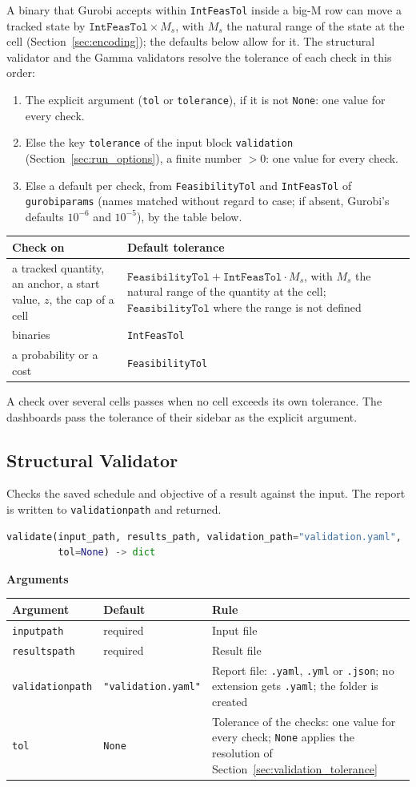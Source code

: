 \documentclass[11pt,a4paper]{article}
\makeatletter
\theoremstyle{plain}
\theoremstyle{definition}
\newcommand{\blockhead}[1]{\par\noindent\textbf{#1}\par\nobreak}
\renewcommand{\_}{\textunderscore\allowbreak{}}
\providecommand{\rejrow}[2]{{\raggedright #1\par} & {\raggedright #2\par} \\}
\providecommand{\typerow}[3]{{\raggedright #1\par} & {\raggedright #2\par} & {\raggedright #3\par} \\}
\providecommand{\tabstart}[2]{\begingroup\small\begin{longtable}{@{}#1@{}}\toprule #2 \\ \midrule \endhead}
\providecommand{\tabend}{\bottomrule\end{longtable}\endgroup}
\makeatother
\begin{document}
A binary that Gurobi accepts within \texttt{IntFeasTol} inside a big-M row can move a tracked state by $\texttt{IntFeasTol} \times M_s$, with $M_s$ the natural range of the state at the cell (Section~\ref{sec:encoding}); the defaults below allow for it.
The structural validator and the Gamma validators resolve the tolerance of each check in this order:
\begin{enumerate}[nosep,label=\arabic*.]
  \item The explicit argument (\texttt{tol} or \texttt{tolerance}), if it is not \texttt{None}: one value for every check.
  \item Else the key \texttt{tolerance} of the input block \texttt{validation} (Section~\ref{sec:run_options}), a finite number $> 0$: one value for every check.
  \item Else a default per check, from \texttt{FeasibilityTol} and \texttt{IntFeasTol} of \texttt{gurobi\_params} (names matched without regard to case; if absent, Gurobi's defaults $10^{-6}$ and $10^{-5}$), by the table below.
\end{enumerate}

\tabstart{p{7.0cm}p{8.0cm}}{Check on & Default tolerance}
\rejrow{a tracked quantity, an anchor, a start value, $z$, the cap of a cell}{$\texttt{FeasibilityTol} + \texttt{IntFeasTol} \cdot M_s$, with $M_s$ the natural range of the quantity at the cell; $\texttt{FeasibilityTol}$ where the range is not defined}
\rejrow{binaries}{\texttt{IntFeasTol}}
\rejrow{a probability or a cost}{\texttt{FeasibilityTol}}
\tabend

A check over several cells passes when no cell exceeds its own tolerance.
The dashboards pass the tolerance of their sidebar as the explicit argument.

\subsection{Structural Validator}
\label{sec:validation_structural}

Checks the saved schedule and objective of a result against the input. The report is written to \texttt{validation\_path} and returned.

\begin{lstlisting}[language=Python]
validate(input_path, results_path, validation_path="validation.yaml",
         tol=None) -> dict
\end{lstlisting}

\blockhead{Arguments}
\tabstart{p{4.0cm}p{3.3cm}p{7.5cm}}{Argument & Default & Rule}
\typerow{\texttt{input\_path}}{required}{Input file}
\typerow{\texttt{results\_path}}{required}{Result file}
\typerow{\texttt{validation\_path}}{\texttt{"validation.yaml"}}{Report file: \texttt{.yaml}, \texttt{.yml} or \texttt{.json}; no extension gets \texttt{.yaml}; the folder is created}
\typerow{\texttt{tol}}{\texttt{None}}{Tolerance of the checks: one value for every check; \texttt{None} applies the resolution of Section~\ref{sec:validation_tolerance}}
\tabend
\end{document}
